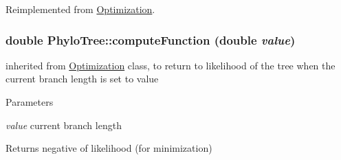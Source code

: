 Reimplemented from \hyperlink{classOptimization_a18bedacde6fd259ff5923c9e936464bd}{Optimization}.\hypertarget{classPhyloTree_a34c7bdc00d48d66e1a8ebfee9af1f100}{
\subsubsection[{computeFunction}]{\setlength{\rightskip}{0pt plus 5cm}double PhyloTree::computeFunction (double {\em value})}}
\label{classPhyloTree_a34c7bdc00d48d66e1a8ebfee9af1f100}
inherited from \hyperlink{classOptimization}{Optimization} class, to return to likelihood of the tree when the current branch length is set to value 
\begin{DoxyParams}{Parameters}
\item[{\em value}]current branch length \end{DoxyParams}
\begin{DoxyReturn}{Returns}
negative of likelihood (for minimization) 
\end{DoxyReturn}



